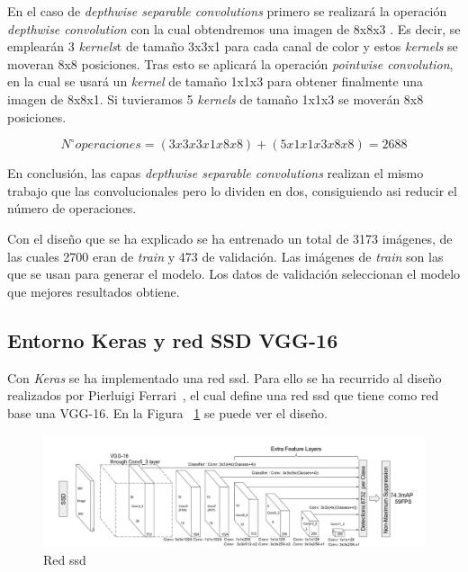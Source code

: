 En el caso de \textit{depthwise separable convolutions} primero se realizará la operación \textit{depthwise convolution} con la cual obtendremos una imagen de 8x8x3 . Es decir, se emplearán 3 \textit{kernels}t de tamaño 3x3x1 para cada canal de color y estos \textit{kernels} se moveran 8x8 posiciones. Tras esto se aplicará la operación \textit{pointwise convolution}, en la cual se usará un \textit{kernel} de tamaño 1x1x3 para obtener finalmente una imagen de 8x8x1. Si tuvieramos 5 \textit{kernels} de tamaño 1x1x3 se moverán 8x8 posiciones.

\begin{equation}\label{mobilenet_formula}
N^{\circ} operaciones = (3x3x3x1x8x8) + (5x1x1x3x8x8) = 2688
\end{equation}

En conclusión, las capas \textit{depthwise separable convolutions} realizan el mismo trabajo que las convolucionales pero lo dividen en dos, consiguiendo asi reducir el número de operaciones.

Con el diseño que se ha explicado se ha entrenado un total de 3173 imágenes, de las cuales 2700 eran de \textit{train} y 473 de validación. Las imágenes de \textit{train} son las que se usan para generar el modelo. Los datos de validación seleccionan el modelo que mejores resultados obtiene.

 \subsection{Entorno Keras y red SSD VGG-16}\label{sub.keras}
 
 Con \textit{Keras} se ha implementado una red \acrshort{ssd}. Para ello se ha recurrido al diseño realizados por Pierluigi Ferrari~\cite{ssd_ferrari}, el cual define una red \acrshort{ssd} que tiene como red base una VGG-16. En la Figura ~\ref{fig.ssd_300} se puede ver el diseño.
 
 \begin{figure}[H] 
\begin{center}
	\includegraphics[width=1.1\textwidth]{figures/Diseno_global/ssd300.png}
   \caption{Red \acrshort{ssd}}
	\label{fig.ssd_300}
\end{center}
\end{figure}

